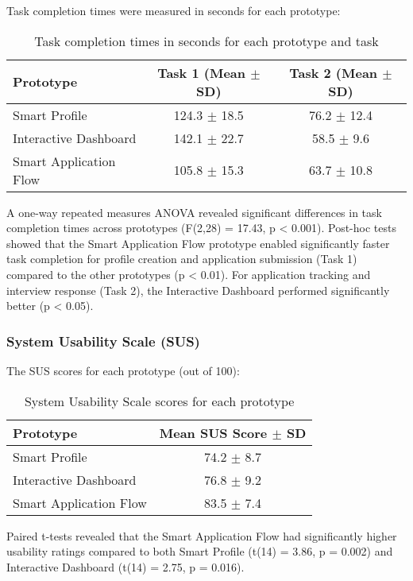 \documentclass[
	letterpaper, %
]{jdf}
\begin{document}
\begin{sloppypar}
Task completion times were measured in seconds for each prototype:

\begin{table}[h]
\centering
\begin{tabular}{|l|c|c|}
\hline
\textbf{Prototype} & \textbf{Task 1 (Mean $\pm$ SD)} & \textbf{Task 2 (Mean $\pm$ SD)} \\
\hline
Smart Profile & 124.3 $\pm$ 18.5 & 76.2 $\pm$ 12.4 \\
Interactive Dashboard & 142.1 $\pm$ 22.7 & 58.5 $\pm$ 9.6 \\
Smart Application Flow & 105.8 $\pm$ 15.3 & 63.7 $\pm$ 10.8 \\
\hline
\end{tabular}
\caption{Task completion times in seconds for each prototype and task}
\end{table}

A one-way repeated measures ANOVA revealed significant differences in task completion times across prototypes (F(2,28) = 17.43, p < 0.001). Post-hoc tests showed that the Smart Application Flow prototype enabled significantly faster task completion for profile creation and application submission (Task 1) compared to the other prototypes (p < 0.01). For application tracking and interview response (Task 2), the Interactive Dashboard performed significantly better (p < 0.05).

\subsubsection{System Usability Scale (SUS)}

The SUS scores for each prototype (out of 100):

\begin{table}[h]
\centering
\begin{tabular}{|l|c|}
\hline
\textbf{Prototype} & \textbf{Mean SUS Score $\pm$ SD} \\
\hline
Smart Profile & 74.2 $\pm$ 8.7 \\
Interactive Dashboard & 76.8 $\pm$ 9.2 \\
Smart Application Flow & 83.5 $\pm$ 7.4 \\
\hline
\end{tabular}
\caption{System Usability Scale scores for each prototype}
\end{table}

Paired t-tests revealed that the Smart Application Flow had significantly higher usability ratings compared to both Smart Profile (t(14) = 3.86, p = 0.002) and Interactive Dashboard (t(14) = 2.75, p = 0.016).


\end{sloppypar}
\end{document}
